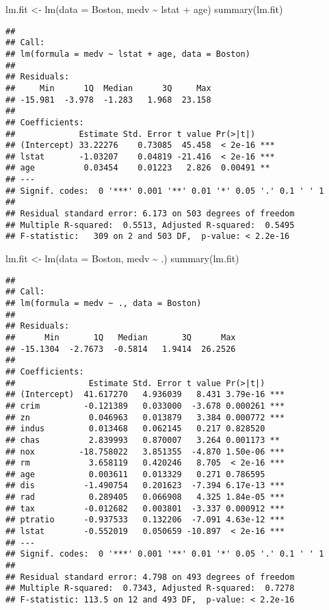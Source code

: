 \documentclass[
]{article}
\newenvironment{Shaded}{\begin{snugshade}}{\end{snugshade}}
\newcommand{\AttributeTok}[1]{\textcolor[rgb]{0.77,0.63,0.00}{#1}}
\newcommand{\FunctionTok}[1]{\textcolor[rgb]{0.00,0.00,0.00}{#1}}
\newcommand{\NormalTok}[1]{#1}
\newcommand{\OtherTok}[1]{\textcolor[rgb]{0.56,0.35,0.01}{#1}}
\newcommand{\SpecialCharTok}[1]{\textcolor[rgb]{0.00,0.00,0.00}{#1}}
\begin{document}
\begin{Shaded}
\begin{Highlighting}[]
\NormalTok{lm.fit }\OtherTok{\textless{}{-}} \FunctionTok{lm}\NormalTok{(}\AttributeTok{data =}\NormalTok{ Boston, medv }\SpecialCharTok{\textasciitilde{}}\NormalTok{ lstat }\SpecialCharTok{+}\NormalTok{ age)}
\FunctionTok{summary}\NormalTok{(lm.fit)}
\end{Highlighting}
\end{Shaded}

\begin{verbatim}
## 
## Call:
## lm(formula = medv ~ lstat + age, data = Boston)
## 
## Residuals:
##     Min      1Q  Median      3Q     Max 
## -15.981  -3.978  -1.283   1.968  23.158 
## 
## Coefficients:
##             Estimate Std. Error t value Pr(>|t|)    
## (Intercept) 33.22276    0.73085  45.458  < 2e-16 ***
## lstat       -1.03207    0.04819 -21.416  < 2e-16 ***
## age          0.03454    0.01223   2.826  0.00491 ** 
## ---
## Signif. codes:  0 '***' 0.001 '**' 0.01 '*' 0.05 '.' 0.1 ' ' 1
## 
## Residual standard error: 6.173 on 503 degrees of freedom
## Multiple R-squared:  0.5513, Adjusted R-squared:  0.5495 
## F-statistic:   309 on 2 and 503 DF,  p-value: < 2.2e-16
\end{verbatim}

\begin{Shaded}
\begin{Highlighting}[]
\NormalTok{lm.fit }\OtherTok{\textless{}{-}} \FunctionTok{lm}\NormalTok{(}\AttributeTok{data =}\NormalTok{ Boston, medv }\SpecialCharTok{\textasciitilde{}}\NormalTok{ .)}
\FunctionTok{summary}\NormalTok{(lm.fit)}
\end{Highlighting}
\end{Shaded}

\begin{verbatim}
## 
## Call:
## lm(formula = medv ~ ., data = Boston)
## 
## Residuals:
##      Min       1Q   Median       3Q      Max 
## -15.1304  -2.7673  -0.5814   1.9414  26.2526 
## 
## Coefficients:
##               Estimate Std. Error t value Pr(>|t|)    
## (Intercept)  41.617270   4.936039   8.431 3.79e-16 ***
## crim         -0.121389   0.033000  -3.678 0.000261 ***
## zn            0.046963   0.013879   3.384 0.000772 ***
## indus         0.013468   0.062145   0.217 0.828520    
## chas          2.839993   0.870007   3.264 0.001173 ** 
## nox         -18.758022   3.851355  -4.870 1.50e-06 ***
## rm            3.658119   0.420246   8.705  < 2e-16 ***
## age           0.003611   0.013329   0.271 0.786595    
## dis          -1.490754   0.201623  -7.394 6.17e-13 ***
## rad           0.289405   0.066908   4.325 1.84e-05 ***
## tax          -0.012682   0.003801  -3.337 0.000912 ***
## ptratio      -0.937533   0.132206  -7.091 4.63e-12 ***
## lstat        -0.552019   0.050659 -10.897  < 2e-16 ***
## ---
## Signif. codes:  0 '***' 0.001 '**' 0.01 '*' 0.05 '.' 0.1 ' ' 1
## 
## Residual standard error: 4.798 on 493 degrees of freedom
## Multiple R-squared:  0.7343, Adjusted R-squared:  0.7278 
## F-statistic: 113.5 on 12 and 493 DF,  p-value: < 2.2e-16
\end{verbatim}
\end{document}
